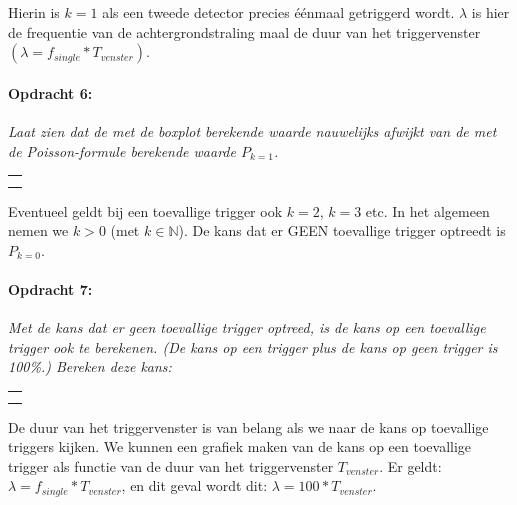 Hierin is $k=1$ als een tweede detector precies éénmaal getriggerd
wordt. $\lambda$ is hier de frequentie van de achtergrondstraling
maal de duur van het triggervenster $\left(\lambda=f_{single}*T_{venster}\right)$. 

\begin{minipage}[t]{1\columnwidth}%

\paragraph{Opdracht 6:}

\textit{Laat zien dat de met de boxplot berekende waarde nauwelijks
afwijkt van de met de Poisson-formule berekende waarde $P_{k=1}$.}

\begin{tabular}{>{\raggedright}p{16.6cm}}
\tabularnewline
\hline 
\tabularnewline
\hline 
\tabularnewline
\hline 
\tabularnewline
\hline 
\end{tabular}%
\end{minipage}

\bigskip{}


Eventueel geldt bij een toevallige trigger ook $k=2$, $k=3$ etc.
In het algemeen nemen we $k>0$ (met $k\mathbb{\in N}$). De kans
dat er GEEN toevallige trigger optreedt is $P_{k=0}$.

\begin{minipage}[t]{1\columnwidth}%

\paragraph{Opdracht 7:}

\textit{Met de kans dat er geen toevallige trigger optreed, is de
kans op een toevallige trigger ook te berekenen. (De kans op een trigger
plus de kans op geen trigger is 100\%.) Bereken deze kans:}

\begin{tabular}{>{\raggedright}p{16.6cm}}
\tabularnewline
\hline 
\tabularnewline
\hline 
\tabularnewline
\hline 
\tabularnewline
\hline 
\end{tabular}%
\end{minipage}

\bigskip{}


De duur van het triggervenster is van belang als we naar de kans op
toevallige triggers kijken. We kunnen een grafiek maken van de kans
op een toevallige trigger als functie van de duur van het triggervenster
$T_{venster}$. Er geldt: $\lambda=f_{single}*T_{venster}$, en dit
geval wordt dit: $\lambda=100*T_{venster}$$ $. 

